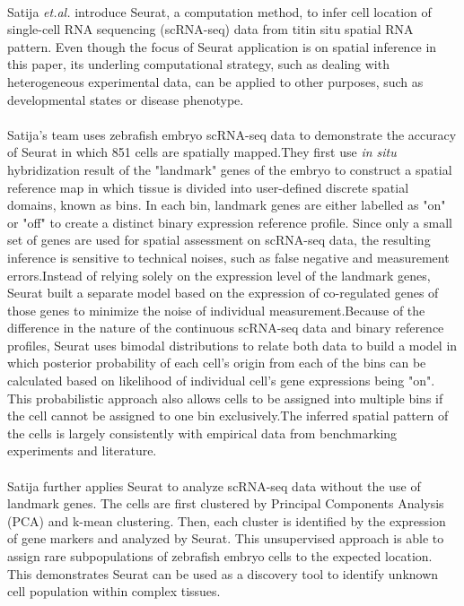 

%
%
  
\medskip
\paragraph{}
Satija \textit{et.al.} introduce Seurat, a computation method, to infer cell location of single-cell RNA sequencing (scRNA-seq) data from \textit{}tit{in situ } spatial RNA pattern. Even though the focus of Seurat application is on spatial inference in this paper, its underling computational strategy, such as dealing with heterogeneous experimental data, can be applied to other purposes, such as developmental states or disease phenotype.
\paragraph{}
Satija's team uses zebrafish embryo scRNA-seq data to demonstrate the accuracy of Seurat in which 851 cells are spatially mapped.They first use \textit{in situ } hybridization result of the "landmark" genes of the embryo to construct a spatial reference map in which tissue is divided into user-defined discrete spatial domains, known as bins. In each bin, landmark genes are either labelled as "on" or "off" to create a distinct binary expression reference profile. Since only a small set of genes are used for spatial assessment on scRNA-seq data, the resulting inference is sensitive to technical noises, such as false negative and measurement errors.Instead of relying solely on the expression level of the landmark genes, Seurat built a separate model based on the expression of co-regulated genes of those genes to minimize the noise of individual measurement.Because of the difference in the nature of the continuous scRNA-seq data and binary reference profiles, Seurat uses bimodal distributions to relate both data to build a model in which posterior probability of each cell's origin from each of the bins can be calculated based on likelihood of individual cell's gene expressions being "on". This probabilistic approach also allows cells to be assigned into multiple bins if the cell cannot be assigned to one bin exclusively.The inferred spatial pattern of the cells is largely consistently with empirical data from benchmarking experiments and literature.
\paragraph{}
Satija further applies Seurat to analyze scRNA-seq data without the use of landmark genes. The cells are first clustered by Principal Components Analysis (PCA) and k-mean clustering. Then, each cluster is identified by the expression of gene markers and analyzed by Seurat. This unsupervised approach is able to assign rare subpopulations of zebrafish embryo cells to the expected location. This demonstrates Seurat can be used as a discovery tool to identify unknown cell population within complex tissues.
